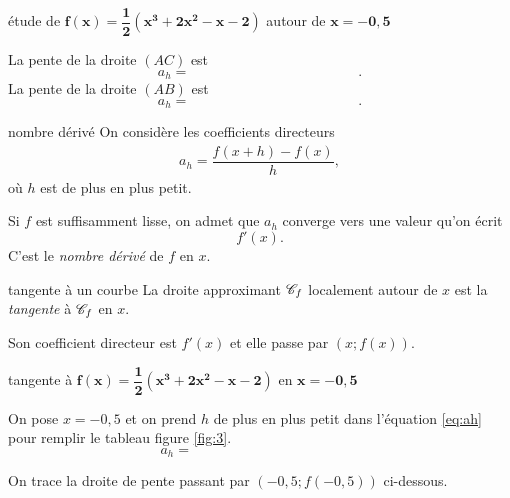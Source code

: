 \begin{exemple*}{étude de $\mathbf{f(x) = \dfrac12(x^3 + 2x^2 - x - 2)}$ autour de $\mathbf{x=-0,5}$}{}
\begin{center}
\end{center}

La pente de la droite $(AC)$ est
	\[ a_h = \qquad\qquad\qquad\qquad\qquad\qquad. \]
La pente de la droite $(AB)$ est
	\[ a_h = \qquad\qquad\qquad\qquad\qquad\qquad. \]

\end{exemple*}


\begin{definition*}{nombre dérivé}{}
	On considère les coefficients directeurs
		\begin{align}
			a_h = \dfrac{f(x+h) - f(x)}h, \label{eq:ah}
		\end{align}
	où $h$ est de plus en plus petit.

	Si $f$ est suffisamment lisse, on admet que $a_h$ converge vers une valeur qu'on écrit
		\[ f'(x). \]
	C'est le \emph{nombre dérivé} de $f$ en $x$.
\end{definition*}

\begin{definition*}{tangente à un courbe}{}
	La droite approximant $\mathcal{C}_f$ localement autour de $x$ est la \emph{tangente} à $\mathcal{C}_f$ en $x$.
	
	Son coefficient directeur est $f'(x)$ et elle passe par $(x; f(x))$.
	
\end{definition*}

\begin{exemple*}{tangente à $\mathbf{f(x) = \dfrac12(x^3 + 2x^2 - x - 2)}$ en $\mathbf{x=-0,5}$}{}

On pose $x=-0,5$ et on prend $h$ de plus en plus petit dans l'équation \eqref{eq:ah} pour remplir le tableau figure \ref{fig:3}.
	\[ a_h = \hspace{5cm} \]
	
On trace la droite de pente \hspace{2cm} passant par $(-0,5 ; f(-0,5))$ ci-dessous.
\end{exemple*}

